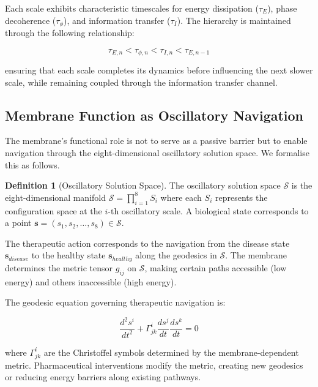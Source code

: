 \documentclass{article}
\theoremstyle{definition}
\newtheorem{definition}[theorem]{Definition}
\theoremstyle{remark}
\begin{document}
Each scale exhibits characteristic timescales for energy dissipation ($\tau_E$), phase decoherence ($\tau_\phi$), and information transfer ($\tau_I$). The hierarchy is maintained through the following relationship:

\begin{equation}
\tau_{E,n} < \tau_{\phi,n} < \tau_{I,n} < \tau_{E,n-1}
\label{eq:hierarchy_condition}
\end{equation}

ensuring that each scale completes its dynamics before influencing the next slower scale, while remaining coupled through the information transfer channel.

\subsection{Membrane Function as Oscillatory Navigation}

The membrane's functional role is not to serve as a passive barrier but to enable navigation through the eight-dimensional oscillatory solution space. We formalise this as follows.

\begin{definition}[Oscillatory Solution Space]
The oscillatory solution space $\mathcal{S}$ is the eight-dimensional manifold $\mathcal{S} = \prod_{i=1}^{8} S_i$ where each $S_i$ represents the configuration space at the $i$-th oscillatory scale. A biological state corresponds to a point $\mathbf{s} = (s_1, s_2, \ldots, s_8) \in \mathcal{S}$.
\end{definition}

The therapeutic action corresponds to the navigation from the disease state $\mathbf{s}_{disease}$ to the healthy state $\mathbf{s}_{healthy}$ along the geodesics in $\mathcal{S}$. The membrane determines the metric tensor $g_{ij}$ on $\mathcal{S}$, making certain paths accessible (low energy) and others inaccessible (high energy).

The geodesic equation governing therapeutic navigation is:

\begin{equation}
\frac{d^2 s^i}{dt^2} + \Gamma^i_{jk} \frac{ds^j}{dt} \frac{ds^k}{dt} = 0
\label{eq:geodesic_equation}
\end{equation}

where $\Gamma^i_{jk}$ are the Christoffel symbols determined by the membrane-dependent metric. Pharmaceutical interventions modify the metric, creating new geodesics or reducing energy barriers along existing pathways.
\end{document}
